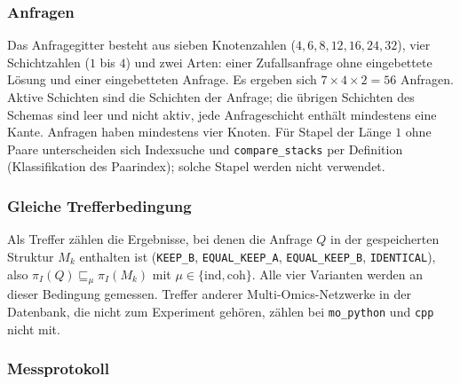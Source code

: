 \subsubsection{Anfragen}

Das Anfragegitter besteht aus sieben Knotenzahlen ($4,6,8,12,16,24,32$), vier Schichtzahlen ($1$ bis $4$) und zwei Arten: einer Zufallsanfrage ohne eingebettete Lösung und einer eingebetteten Anfrage. Es ergeben sich $7\times4\times2=56$ Anfragen. Aktive Schichten sind die Schichten der Anfrage; die übrigen Schichten des Schemas sind leer und nicht aktiv, jede Anfrageschicht enthält mindestens eine Kante. Anfragen haben mindestens vier Knoten. Für Stapel der Länge $1$ ohne Paare unterscheiden sich Indexsuche und \texttt{compare\_stacks} per Definition (Klassifikation des Paarindex); solche Stapel werden nicht verwendet.

\subsubsection{Gleiche Trefferbedingung}

Als Treffer zählen die Ergebnisse, bei denen die Anfrage $Q$ in der gespeicherten Struktur $M_k$ enthalten ist (\texttt{KEEP\_B}, \texttt{EQUAL\_KEEP\_A}, \texttt{EQUAL\_KEEP\_B}, \texttt{IDENTICAL}), also $\pi_I(Q)\sqsubseteq_\mu\pi_I(M_k)$ mit $\mu\in\{\mathrm{ind},\mathrm{coh}\}$. Alle vier Varianten werden an dieser Bedingung gemessen. Treffer anderer Multi-Omics-Netzwerke in der Datenbank, die nicht zum Experiment gehören, zählen bei \texttt{mo\_python} und \texttt{cpp} nicht mit.

\subsubsection{Messprotokoll}

